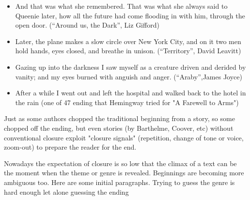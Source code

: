 \documentclass[11pt]{article}
\begin{document}
\begin{itemize}
    \item And that was what she remembered. That was what she always said to Queenie later, how all the future had come flooding in with him, through the open door. (``Around us, the Dark'', Liz Gifford) 
    \item Later, the plane makes a slow circle over New York City, and on it two men hold hands, eyes closed, and breathe in unison. (``Territory'', David Leavitt)

    \item Gazing up into the darkness I saw myself as a creature driven and derided by vanity; and my eyes burned with anguish and anger. (``Araby'',James Joyce)
    \item After a while I went out and left the hospital and walked back to the hotel in the rain (one of 47 ending that  Hemingway tried for "A Farewell to Arms")

\end{itemize}


Just as some authors chopped the traditional beginning from a story, so some chopped off the ending, but even stories (by Barthelme, Coover, etc) without conventional closure exploit "closure signals" (repetition, change of tone or voice, zoom-out) to prepare the reader for the end.




Nowadays the expectation of closure is so low that the climax of a text can be the moment when the theme or genre is revealed. Beginnings are becoming more ambiguous too. Here are some initial paragraphs. Trying to guess the genre is hard enough let alone guessing the ending
\end{document}

